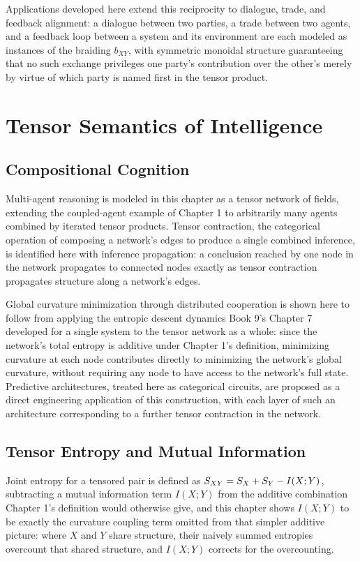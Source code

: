 Applications developed here extend this reciprocity to dialogue, trade, and feedback alignment: a dialogue between two parties, a trade between two agents, and a feedback loop between a system and its environment are each modeled as instances of the braiding $b_{XY}$, with symmetric monoidal structure guaranteeing that no such exchange privileges one party's contribution over the other's merely by virtue of which party is named first in the tensor product.

\part{Tensor Semantics of Intelligence}

\chapter{Compositional Cognition}

Multi-agent reasoning is modeled in this chapter as a tensor network of fields, extending the coupled-agent example of Chapter 1 to arbitrarily many agents combined by iterated tensor products. Tensor contraction, the categorical operation of composing a network's edges to produce a single combined inference, is identified here with inference propagation: a conclusion reached by one node in the network propagates to connected nodes exactly as tensor contraction propagates structure along a network's edges.

Global curvature minimization through distributed cooperation is shown here to follow from applying the entropic descent dynamics Book 9's Chapter 7 developed for a single system to the tensor network as a whole: since the network's total entropy is additive under Chapter 1's definition, minimizing curvature at each node contributes directly to minimizing the network's global curvature, without requiring any node to have access to the network's full state. Predictive architectures, treated here as categorical circuits, are proposed as a direct engineering application of this construction, with each layer of such an architecture corresponding to a further tensor contraction in the network.

\chapter{Tensor Entropy and Mutual Information}

Joint entropy for a tensored pair is defined as $S_{XY} = S_X + S_Y - I(X;Y)$, subtracting a mutual information term $I(X;Y)$ from the additive combination Chapter 1's definition would otherwise give, and this chapter shows $I(X;Y)$ to be exactly the curvature coupling term omitted from that simpler additive picture: where $X$ and $Y$ share structure, their naively summed entropies overcount that shared structure, and $I(X;Y)$ corrects for the overcounting.

